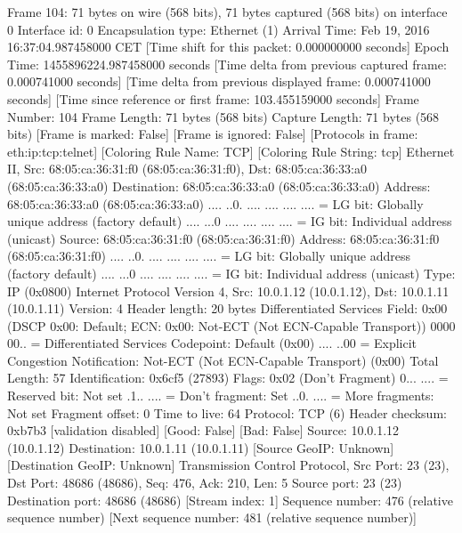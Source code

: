 Frame 104: 71 bytes on wire (568 bits), 71 bytes captured (568 bits) on interface 0
    Interface id: 0
    Encapsulation type: Ethernet (1)
    Arrival Time: Feb 19, 2016 16:37:04.987458000 CET
    [Time shift for this packet: 0.000000000 seconds]
    Epoch Time: 1455896224.987458000 seconds
    [Time delta from previous captured frame: 0.000741000 seconds]
    [Time delta from previous displayed frame: 0.000741000 seconds]
    [Time since reference or first frame: 103.455159000 seconds]
    Frame Number: 104
    Frame Length: 71 bytes (568 bits)
    Capture Length: 71 bytes (568 bits)
    [Frame is marked: False]
    [Frame is ignored: False]
    [Protocols in frame: eth:ip:tcp:telnet]
    [Coloring Rule Name: TCP]
    [Coloring Rule String: tcp]
Ethernet II, Src: 68:05:ca:36:31:f0 (68:05:ca:36:31:f0), Dst: 68:05:ca:36:33:a0 (68:05:ca:36:33:a0)
    Destination: 68:05:ca:36:33:a0 (68:05:ca:36:33:a0)
        Address: 68:05:ca:36:33:a0 (68:05:ca:36:33:a0)
        .... ..0. .... .... .... .... = LG bit: Globally unique address (factory default)
        .... ...0 .... .... .... .... = IG bit: Individual address (unicast)
    Source: 68:05:ca:36:31:f0 (68:05:ca:36:31:f0)
        Address: 68:05:ca:36:31:f0 (68:05:ca:36:31:f0)
        .... ..0. .... .... .... .... = LG bit: Globally unique address (factory default)
        .... ...0 .... .... .... .... = IG bit: Individual address (unicast)
    Type: IP (0x0800)
Internet Protocol Version 4, Src: 10.0.1.12 (10.0.1.12), Dst: 10.0.1.11 (10.0.1.11)
    Version: 4
    Header length: 20 bytes
    Differentiated Services Field: 0x00 (DSCP 0x00: Default; ECN: 0x00: Not-ECT (Not ECN-Capable Transport))
        0000 00.. = Differentiated Services Codepoint: Default (0x00)
        .... ..00 = Explicit Congestion Notification: Not-ECT (Not ECN-Capable Transport) (0x00)
    Total Length: 57
    Identification: 0x6cf5 (27893)
    Flags: 0x02 (Don't Fragment)
        0... .... = Reserved bit: Not set
        .1.. .... = Don't fragment: Set
        ..0. .... = More fragments: Not set
    Fragment offset: 0
    Time to live: 64
    Protocol: TCP (6)
    Header checksum: 0xb7b3 [validation disabled]
        [Good: False]
        [Bad: False]
    Source: 10.0.1.12 (10.0.1.12)
    Destination: 10.0.1.11 (10.0.1.11)
    [Source GeoIP: Unknown]
    [Destination GeoIP: Unknown]
Transmission Control Protocol, Src Port: 23 (23), Dst Port: 48686 (48686), Seq: 476, Ack: 210, Len: 5
    Source port: 23 (23)
    Destination port: 48686 (48686)
    [Stream index: 1]
    Sequence number: 476    (relative sequence number)
    [Next sequence number: 481    (relative sequence number)]
